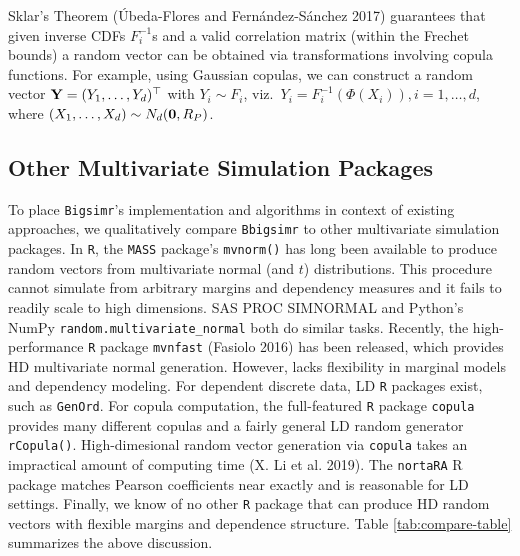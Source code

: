 \documentclass{article}
\begin{document}
Sklar's Theorem (Úbeda-Flores and Fernández-Sánchez 2017) guarantees
that given inverse CDFs \(F_i^{-1}\)s and a valid correlation matrix
(within the Frechet bounds) a random vector can be obtained via
transformations involving copula functions. For example, using Gaussian
copulas, we can construct a random vector
\({\bf Y} = (Y_1, \ldots, Y_d)^\top\) with \(Y_i \sim F_i\),
viz.~\(Y_i = F_i^{-1}(\Phi(X_i)), i=1, \ldots, d\), where
\((X_1, \ldots, X_d) \sim N_d({\bf 0}, R_P)\).

\hypertarget{other-multivariate-simulation-packages}{%
\subsection{Other Multivariate Simulation
Packages}\label{other-multivariate-simulation-packages}}

To place \texttt{Bigsimr}'s implementation and algorithms in context of
existing approaches, we qualitatively compare \texttt{Bbigsimr} to other
multivariate simulation packages. In \texttt{R}, the \texttt{MASS}
package's \texttt{mvnorm()} has long been available to produce random
vectors from multivariate normal (and \(t\)) distributions. This
procedure cannot simulate from arbitrary margins and dependency measures
and it fails to readily scale to high dimensions. SAS PROC SIMNORMAL and
Python's NumPy \texttt{random.multivariate\_normal} both do similar
tasks. Recently, the high-performance \texttt{R} package
\texttt{mvnfast} (Fasiolo 2016) has been released, which provides HD
multivariate normal generation. However, lacks flexibility in marginal
models and dependency modeling. For dependent discrete data, LD
\texttt{R} packages exist, such as \texttt{GenOrd}. For copula
computation, the full-featured \texttt{R} package \texttt{copula}
provides many different copulas and a fairly general LD random generator
\texttt{rCopula()}. High-dimesional random vector generation via
\texttt{copula} takes an impractical amount of computing time (X. Li et
al. 2019). The \texttt{nortaRA} R package matches Pearson coefficients
near exactly and is reasonable for LD settings. Finally, we know of no
other \texttt{R} package that can produce HD random vectors with
flexible margins and dependence structure. Table \ref{tab:compare-table}
summarizes the above discussion.
\end{document}
